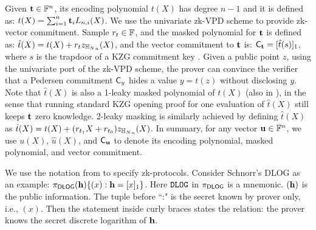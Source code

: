 Given ${{\mathbf {t}}} \in \mathbb{F}^n$, its encoding polynomial $t(X)$ has
degree $n-1$ and it is defined as: 
$t(X) = \sum_{i=1}^n {{\mathbf {t}}}_i L_{n,i}(X)$. 
We use the univariate zk-VPD scheme \cite{zkvsql} to provide
zk-vector commitment. 
Sample $r_t \in \mathbb{F}$, and the masked polynomial
for ${{\mathbf {t}}}$ is defined as:
$\hat{t}(X) = t(X) + r_t z_{{\mathbb{H}_{N}}_n}(X)$,
and the vector commitment to ${{\mathbf {t}}}$ is:
${\mathsf{C}}_{{{\mathbf {t}}}} = [\hat{t}(s)]_1$, where
$s$ is the trapdoor of a KZG commitment key \cite{Kate10}.
Given a public point $z$, using the univariate port of
the zk-VPD scheme, the prover can convince the verifier
that a Pedersen commitment ${\mathsf{C}}_y$ hides a 
value $y = t(z)$ without disclosing $y$.
Note that $\hat{t}(X)$ is also a 1-leaky masked polynomial
of $t(X)$ \cite[Section 3.6]{CCG23} (also in \cite{GWC19,Lunar}), in
the sense that running standard KZG opening proof for one evaluation
of $\hat{t}(X)$ still keeps ${{\mathbf {t}}}$ zero knowledge. 2-leaky masking
is similarly achieved by defining
$\hat{t}(X)$ as $\hat{t}(X) = t(X) + (r_{t_1} X + r_{t_0})z_{{\mathbb{H}_{N}}_n}(X)$.
In summary, for any vector ${{\mathbf {u}}}\in \mathbb{F}^n$, we use $u(X)$,
$\hat{u}(X)$, and ${\mathsf{C}}_{{{\mathbf {u}}}}$ to denote its
encoding polynomial, masked polynomial, and vector commitment.

We use the notation from
\cite{Cam97} to specify zk-protocols. 
Consider Schnorr's DLOG as an example:
$\pi_{\textsf{DLOG}}({{\bf{\mathbf h}}})\{(x): {{\bf{\mathbf h}}} = [x]_1\}$.
Here ${\tt DLOG}$ in $\pi_{\textsf{DLOG}}$ is a mnemonic.
$({{\bf{\mathbf h}}})$ is the public information.
The tuple before ``:"
is the secret known by prover only, i.e.,
$(x)$. Then the statement inside curly braces states
the relation: the prover knows the secret discrete logarithm
of ${{\bf{\mathbf h}}}$.  

% 

